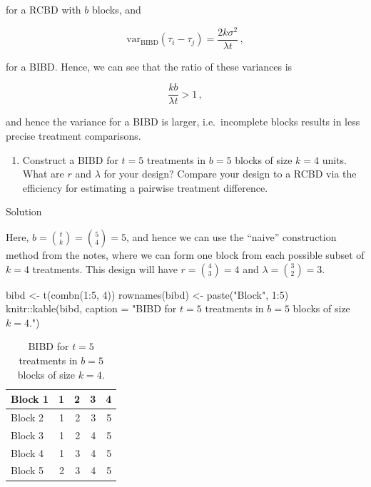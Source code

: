 \documentclass[
]{book}
\newenvironment{Shaded}{\begin{snugshade}}{\end{snugshade}}
\newcommand{\AttributeTok}[1]{\textcolor[rgb]{0.77,0.63,0.00}{#1}}
\newcommand{\DecValTok}[1]{\textcolor[rgb]{0.00,0.00,0.81}{#1}}
\newcommand{\FunctionTok}[1]{\textcolor[rgb]{0.00,0.00,0.00}{#1}}
\newcommand{\NormalTok}[1]{#1}
\newcommand{\OtherTok}[1]{\textcolor[rgb]{0.56,0.35,0.01}{#1}}
\newcommand{\SpecialCharTok}[1]{\textcolor[rgb]{0.00,0.00,0.00}{#1}}
\newcommand{\StringTok}[1]{\textcolor[rgb]{0.31,0.60,0.02}{#1}}
\providecommand{\tightlist}{%
  \setlength{\itemsep}{0pt}\setlength{\parskip}{0pt}}
\theoremstyle{definition}
\theoremstyle{definition}
\theoremstyle{definition}
\theoremstyle{definition}
\theoremstyle{remark}
\begin{document}
for a RCBD with \(b\) blocks, and

\[
\mbox{var}_{\mbox{BIBD}}\left(\tau_i - \tau_j\right) = \frac{2k\sigma^2}{\lambda t}\,,
\]

for a BIBD. Hence, we can see that the ratio of these variances is

\[
\frac{kb}{\lambda t} > 1\,,
\]

and hence the variance for a BIBD is larger, i.e.~incomplete blocks results in less precise treatment comparisons.

\begin{enumerate}
\def\labelenumi{\arabic{enumi}.}
\setcounter{enumi}{3}
\tightlist
\item
  Construct a BIBD for \(t=5\) treatments in \(b=5\) blocks of size \(k=4\) units. What are \(r\) and \(\lambda\) for your design? Compare your design to a RCBD via the efficiency for estimating a pairwise treatment difference.
\end{enumerate}

Solution

Here, \(b = {t \choose k} = {5 \choose 4} = 5\), and hence we can use the ``naive'' construction method from the notes, where we can form one block from each possible subset of \(k=4\) treatments. This design will have \(r = {4 \choose 3} = 4\) and \(\lambda = {3 \choose 2} = 3\).

\begin{Shaded}
\begin{Highlighting}[]
\NormalTok{bibd }\OtherTok{\textless{}{-}} \FunctionTok{t}\NormalTok{(}\FunctionTok{combn}\NormalTok{(}\DecValTok{1}\SpecialCharTok{:}\DecValTok{5}\NormalTok{, }\DecValTok{4}\NormalTok{))}
\FunctionTok{rownames}\NormalTok{(bibd) }\OtherTok{\textless{}{-}} \FunctionTok{paste}\NormalTok{(}\StringTok{"Block"}\NormalTok{, }\DecValTok{1}\SpecialCharTok{:}\DecValTok{5}\NormalTok{)}
\NormalTok{knitr}\SpecialCharTok{::}\FunctionTok{kable}\NormalTok{(bibd, }\AttributeTok{caption =} \StringTok{"BIBD for $t = 5$ treatments in $b=5$ blocks of size $k=4$."}\NormalTok{)}
\end{Highlighting}
\end{Shaded}

\begin{table}

\caption{\label{tab:naive-bibd-construction}BIBD for $t = 5$ treatments in $b=5$ blocks of size $k=4$.}
\centering
\begin{tabular}[t]{l|r|r|r|r}
\hline
Block 1 & 1 & 2 & 3 & 4\\
\hline
Block 2 & 1 & 2 & 3 & 5\\
\hline
Block 3 & 1 & 2 & 4 & 5\\
\hline
Block 4 & 1 & 3 & 4 & 5\\
\hline
Block 5 & 2 & 3 & 4 & 5\\
\hline
\end{tabular}
\end{table}
\end{document}
